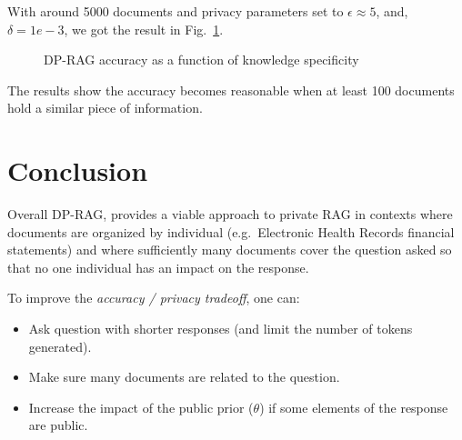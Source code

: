 \documentclass[
  12pt,
  a4paper,
]{article}
\makeatletter
\newcommand*\pandocbounded[1]{%
  \sbox\pandoc@box{#1}%
  \Gscale@div\@tempa{\textheight}{\dimexpr\ht\pandoc@box+\dp\pandoc@box\relax}%
  \Gscale@div\@tempb{\linewidth}{\wd\pandoc@box}%
  \ifdim\@tempb\p@<\@tempa\p@\let\@tempa\@tempb\fi%
  \ifdim\@tempa\p@<\p@\scalebox{\@tempa}{\usebox\pandoc@box}%
  \else\usebox{\pandoc@box}%
  \fi%
}
\providecommand{\tightlist}{%
  \setlength{\itemsep}{0pt}\setlength{\parskip}{0pt}}
\makeatother
\begin{document}
With around 5000 documents and privacy parameters set to
\(\epsilon \approx 5\), and, \(\delta=1e-3\), we got the result in
Fig.~\ref{fig:accuracy}.

\begin{figure}
\centering
\pandocbounded{}
\caption{DP-RAG accuracy as a function of knowledge
specificity}\label{fig:accuracy}
\end{figure}

The results show the accuracy becomes reasonable when at least 100
documents hold a similar piece of information.

\section{Conclusion}\label{conclusion}

Overall DP-RAG, provides a viable approach to private RAG in contexts
where documents are organized by individual (e.g.~Electronic Health
Records financial statements) and where sufficiently many documents
cover the question asked so that no one individual has an impact on the
response.

To improve the \emph{accuracy / privacy tradeoff}, one can:

\begin{itemize}
\tightlist
\item
  Ask question with shorter responses (and limit the number of tokens
  generated).
\item
  Make sure many documents are related to the question.
\item
  Increase the impact of the public prior (\(\theta\)) if some elements
  of the response are public.
\end{itemize}
\end{document}
